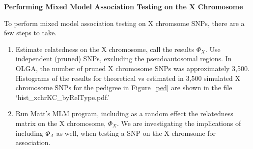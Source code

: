 \documentclass[11pt]{article} %
\begin{document}
\newpage
\textbf{Performing Mixed Model Association Testing on the X Chromosome}

To perform mixed model association testing on X chromsome SNPs, there are a few steps to take.
\begin{enumerate}
\item Estimate relatedness on the X chromosome, call the results $\Phi_X$. Use independent (pruned) SNPs, excluding the pseudoautosomal regions. In OLGA, the number of pruned X chromosome SNPs was approximately 3,500. Histograms of the results for theoretical vs estimated in 3,500 simulated X chromosome SNPs for the pedigree in Figure~\ref{ped} are shown in the file `hist\_xchrKC\_byRelType.pdf.' 
\item Run Matt's MLM program, including as a random effect the relatedness matrix on the X chromosome, $\Phi_X$. We are investigating the implications of including $\Phi_A$ as well, when testing a SNP on the X chromsome for association.
\end{enumerate}
\end{document}

